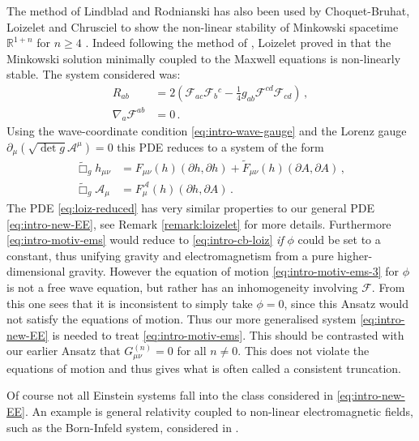 \documentclass[11pt, a4paper]{amsart}
\numberwithin{equation}{section}
\numberwithin{theorem}{section}
\newcommand{\R}{\mathbb{R}}
\newcommand{\p}{\partial}
\newcommand{\A}{\mathcal{A}}
\newcommand{\mn}{{\mu \nu}}
\newcommand{\tbox}{\widetilde{\Box}}
\begin{document}
The method of Lindblad and Rodnianski has also been used by Choquet-Bruhat, Loizelet and Chrusciel to show the non-linear stability of Minkowski spacetime $\R^{1+n}$ for $n\geq 4$ \cite{ChoquetBruhat:2006jc}. Indeed following the method of \cite{LR:04}, Loizelet proved in \cite{MR2582443} that the Minkowski solution minimally coupled to the  Maxwell equations is non-linearly stable. The system considered was:
\begin{equation} \begin{split}
R_{ab} &= 2 \left( \mathcal{F}_{ac} \mathcal{F}_b {}^c - \frac{1}{4} g_{ab} \mathcal{F}^{cd} \mathcal{F}_{cd} \right) \,,\\
\nabla_a \mathcal{F}^{ab} &=0   \,. \end{split} \label{eq:intro-cb-loiz} \end{equation}
Using the wave-coordinate condition \eqref{eq:intro-wave-gauge} and the Lorenz gauge $\p_\mu \left( \sqrt{\det g} \A^\mu \right)=0$ this PDE reduces to a system of the form
\begin{equation} \begin{split}
\tbox_g h_\mn & = F_\mn (h)(\p h, \p h) + \widetilde{F}_\mn (h)(\p A, \p A) \,, \\
\tbox_g \mathcal{A}_\mu & = F^\A_\mu (h) (\p h, \p A) \,. \end{split} \label{eq:loiz-reduced} \end{equation} 
The PDE \eqref{eq:loiz-reduced} has very similar properties to our general PDE \eqref{eq:intro-new-EE}, see Remark \ref{remark:loizelet} for more details. Furthermore \eqref{eq:intro-motiv-ems} would reduce to  \eqref{eq:intro-cb-loiz} \textit{if} $\phi$ could be set to a constant, thus unifying gravity and electromagnetism from a pure higher-dimensional gravity.  However the equation of motion \eqref{eq:intro-motiv-ems-3} for $\phi$ is not a free wave equation, but rather has an inhomogeneity involving $\mathcal{F}$. From this one sees that it is inconsistent to simply take $\phi = 0$, since this Ansatz would not satisfy the equations of motion. Thus our more generalised system \eqref{eq:intro-new-EE} is needed to treat \eqref{eq:intro-motiv-ems}. This should be contrasted with our earlier Ansatz that $G^{(n)}_\mn = 0$ for all $n \neq 0$. This does not violate the equations of motion and thus gives what is often called a consistent truncation.

Of course not all Einstein systems fall into the class considered in \eqref{eq:intro-new-EE}. An example is general relativity coupled to non-linear electromagnetic fields, such as the Born-Infeld system, considered in \cite{Speck}. 
\end{document}
